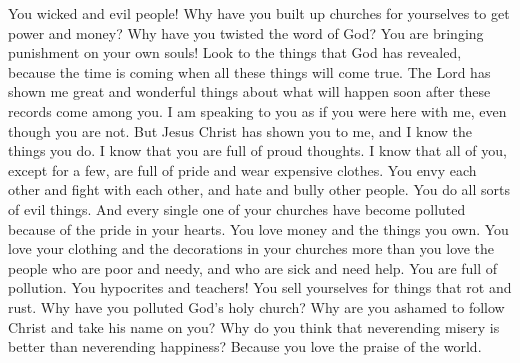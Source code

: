 You wicked and evil people! Why have you built up churches for yourselves to get power and money? Why have you twisted the word of God? You are bringing punishment on your own souls! Look to the things that God has revealed, because the time is coming when all these things will come true.
\bverse \iffalse Behold, the Lord hath shown unto me great and marvelous things concerning that which must shortly come, at that day when these things shall come forth among you. \fi
The Lord has shown me great and wonderful things about what will happen soon after these records come among you.
\bverse \iffalse Behold, I speak unto you as if ye were present, and yet ye are not. But behold, Jesus Christ hath shown you unto me, and I know your doing. \fi
I am speaking to you as if you were here with me, even though you are not. But Jesus Christ has shown you to me, and I know the things you do.
\bverse \iffalse And I know that ye do walk in the pride of your hearts; and there are none save a few only who do not lift themselves up in the pride of their hearts, unto the wearing of very fine apparel, unto envying, and strifes, and malice, and persecutions, and all manner of iniquities; and your churches, yea, even every one, have become polluted because of the pride of your hearts. \fi
I know that you are full of proud thoughts. I know that all of you, except for a few, are full of pride and wear expensive clothes. You envy each other and fight with each other, and hate and bully other people. You do all sorts of evil things. And every single one of your churches have become polluted because of the pride in your hearts.
\bverse \iffalse For behold, ye do love money, and your substance, and your fine apparel, and the adorning of your churches, more than ye love the poor and the needy, the sick and the afflicted. \fi
You love money and the things you own. You love your clothing and the decorations in your churches more than you love the people who are poor and needy, and who are sick and need help.
\bverse \iffalse O ye pollutions, ye hypocrites, ye teachers, who sell yourselves for that which will canker, why have ye polluted the holy church of God? Why are ye ashamed to take upon you the name of Christ? Why do ye not think that greater is the value of an endless happiness than that misery which never dies--because of the praise of the world? \fi
You are full of pollution. You hypocrites and teachers! You sell yourselves for things that rot and rust. Why have you polluted God's holy church? Why are you ashamed to follow Christ and take his name on you? Why do you think that neverending misery is better than neverending happiness? Because you love the praise of the world.
